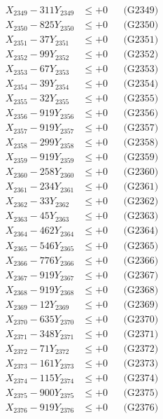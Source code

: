 \documentclass[a4paper,10pt]{article}
\begin{document}
{\begin{align}
X_{2349} - 311Y_{2349} &\leq +0 && \text{(G2349)} \\
X_{2350} - 825Y_{2350} &\leq +0 && \text{(G2350)} \\
\allowbreak
X_{2351} - 37Y_{2351} &\leq +0 && \text{(G2351)} \\
X_{2352} - 99Y_{2352} &\leq +0 && \text{(G2352)} \\
X_{2353} - 67Y_{2353} &\leq +0 && \text{(G2353)} \\
X_{2354} - 39Y_{2354} &\leq +0 && \text{(G2354)} \\
X_{2355} - 32Y_{2355} &\leq +0 && \text{(G2355)} \\
X_{2356} - 919Y_{2356} &\leq +0 && \text{(G2356)} \\
X_{2357} - 919Y_{2357} &\leq +0 && \text{(G2357)} \\
X_{2358} - 299Y_{2358} &\leq +0 && \text{(G2358)} \\
X_{2359} - 919Y_{2359} &\leq +0 && \text{(G2359)} \\
X_{2360} - 258Y_{2360} &\leq +0 && \text{(G2360)} \\
\allowbreak
X_{2361} - 234Y_{2361} &\leq +0 && \text{(G2361)} \\
X_{2362} - 33Y_{2362} &\leq +0 && \text{(G2362)} \\
X_{2363} - 45Y_{2363} &\leq +0 && \text{(G2363)} \\
X_{2364} - 462Y_{2364} &\leq +0 && \text{(G2364)} \\
X_{2365} - 546Y_{2365} &\leq +0 && \text{(G2365)} \\
X_{2366} - 776Y_{2366} &\leq +0 && \text{(G2366)} \\
X_{2367} - 919Y_{2367} &\leq +0 && \text{(G2367)} \\
X_{2368} - 919Y_{2368} &\leq +0 && \text{(G2368)} \\
X_{2369} - 12Y_{2369} &\leq +0 && \text{(G2369)} \\
X_{2370} - 635Y_{2370} &\leq +0 && \text{(G2370)} \\
\allowbreak
X_{2371} - 348Y_{2371} &\leq +0 && \text{(G2371)} \\
X_{2372} - 71Y_{2372} &\leq +0 && \text{(G2372)} \\
X_{2373} - 161Y_{2373} &\leq +0 && \text{(G2373)} \\
X_{2374} - 115Y_{2374} &\leq +0 && \text{(G2374)} \\
X_{2375} - 900Y_{2375} &\leq +0 && \text{(G2375)} \\
X_{2376} - 919Y_{2376} &\leq +0 && \text{(G2376)} \\

\end{align}}
\end{document}
